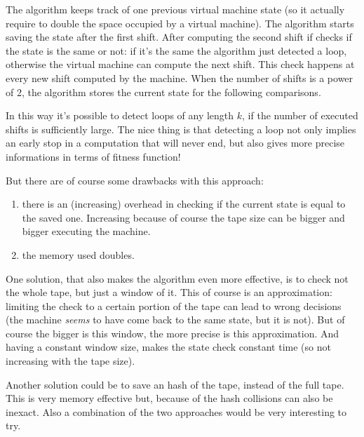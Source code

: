 \documentclass{report}
\begin{document}
The algorithm keeps track of one previous virtual machine state (so it actually require to double the space occupied by a virtual machine). The algorithm starts saving the state after the first shift. After computing the second shift if checks if the state is the same or not: if it's the same the algorithm just detected a loop, otherwise the virtual machine can compute the next shift. This check happens at every new shift computed by the machine. When the number of shifts is a power of 2, the algorithm stores the current state for the following comparisons.

In this way it's possible to detect loops of any length $k$, if the number of executed shifts is sufficiently large. The nice thing is that detecting a loop not only implies an early stop in a computation that will never end, but also gives more precise informations in terms of fitness function!

But there are of course some drawbacks with this approach:
\begin{enumerate}
\item there is an (increasing) overhead in checking if the current state is equal to the saved one. Increasing because of course the tape size can be bigger and bigger executing the machine.
\item the memory used doubles.
\end{enumerate}

One solution, that also makes the algorithm even more effective, is to check not the whole tape, but just a window of it. This of course is an approximation: limiting the check to a certain portion of the tape can lead to wrong decisions (the machine \textit{seems} to have come back to the same state, but it is not).
But of course the bigger is this window, the more precise is this approximation. And having a constant window size, makes the state check constant time (so not increasing with the tape size).

Another solution could be to save an hash of the tape, instead of the full tape. This is very memory effective but, because of the hash collisions can also be inexact. Also a combination of the two approaches would be very interesting to try.





\end{document}
